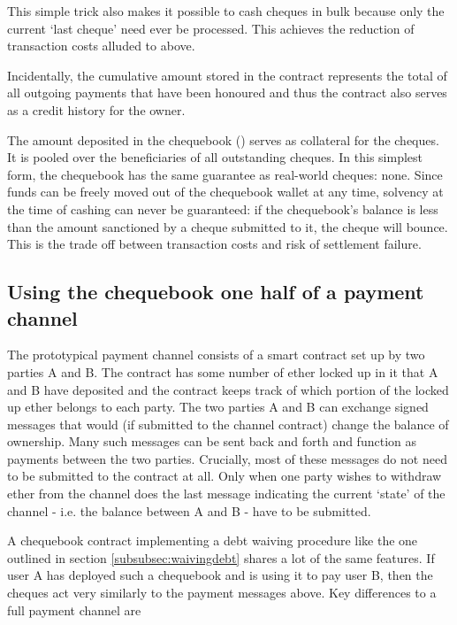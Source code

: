 This simple trick also makes it possible to cash cheques in bulk because only the current `last cheque' need ever be processed. This achieves the reduction of transaction costs alluded to above.

Incidentally, the cumulative amount stored in the contract represents the total of all outgoing payments that have been honoured and thus the contract also serves as a credit history for the owner.

The amount deposited in the chequebook () serves as collateral for the cheques. It is pooled over the beneficiaries of all outstanding cheques.
In this simplest form, the chequebook has the same guarantee as real-world cheques: none. Since funds can be freely moved out of the chequebook wallet at any time, solvency at the time of cashing can never be guaranteed: if the chequebook's balance is less than the amount sanctioned by a cheque submitted to it, the cheque will bounce. This is the trade off between transaction costs and risk of settlement failure.






\subsection{Using the chequebook one half of a payment channel}
The prototypical payment channel consists of a smart contract set up by two parties A and B. The contract has some number of ether locked up in it that A and B have deposited and the contract keeps track of which portion of the locked up ether belongs to each party. The two parties A and B can exchange signed messages that would (if submitted to the channel contract) change the balance of ownership. Many such messages can be sent back and forth and function as payments between the two parties. Crucially, most of these messages do not need to be submitted to the contract at all. Only when one party wishes to withdraw ether from the channel does the last message indicating the current `state' of the channel - i.e. the balance between A and B - have to be submitted.

A chequebook contract implementing a debt waiving procedure like the one outlined in section \ref{subsubsec:waivingdebt} shares a lot of the same features. If user A has deployed such a chequebook and is using it to pay user B, then the cheques act very similarly to the payment messages above. Key differences to a full payment channel are

